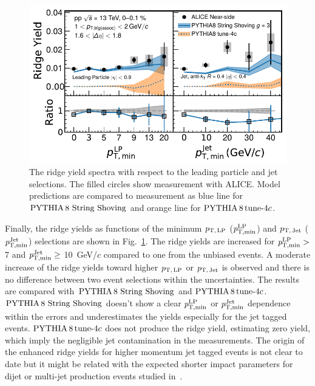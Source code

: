 \begin{figure}[h!]
	\centering
	\includegraphics[width=0.99\linewidth]{./figures/Fig6_RidgeYieldESE.pdf}
	\caption{The ridge yield spectra with respect to the leading particle and jet selections. The filled circles show measurement with ALICE. Model predictions are compared to measurement as blue line for $\mathrm{PYTHIA}\,8~\mathrm{String}~\mathrm{Shoving}$ and orange line for $\mathrm{PYTHIA}\,8\,\mathrm{tune}{\text -}4c$.}
	\label{fig:RidgeYield_ESE}
\end{figure}

Finally, the ridge yields as functions of the minimum $p_\mathrm{T,\,LP}$ ($\it{p}^{\rm{LP}}_{\rm{T,min}}$) and $p_\mathrm{T,\,Jet}$ ($\it{p}^{\rm{Jet}}_{\rm{T,min}}$) selections are shown in Fig.~\ref{fig:RidgeYield_ESE}. The ridge yields are increased for $\it{p}^{\rm{LP}}_{\rm{T,min}} >$ 7 and $\it{p}^{\rm{Jet}}_{\rm{T,min}} \ge$ 10~GeV/$c$ compared to one from the unbiased events. A moderate increase of the ridge yields toward higher $p_\mathrm{T,\,LP}$ or $p_\mathrm{T,\,Jet}$ is observed and there is no difference between two event selections within the uncertainties.
The results are compared with $\mathrm{PYTHIA}\,8~\mathrm{String}~\mathrm{Shoving}$ and $\mathrm{PYTHIA}\,8\,\mathrm{tune}{\text -}4c$. $\mathrm{PYTHIA}\,8~\mathrm{String}~\mathrm{Shoving}$ doesn't show a clear $\it{p}^{\rm{LP}}_{\rm{T,min}}$ or $\it{p}^{\rm{Jet}}_{\rm{T,min}}$ dependence within the errors and underestimates the yields especially for the jet tagged events. $\mathrm{PYTHIA}\,8\,\mathrm{tune}{\text -}4c$ does not produce the ridge yield, estimating zero yield, which imply the negligible jet contamination in the measurements.
The origin of the enhanced ridge yields for higher momentum jet tagged events is not clear to date but it might be related with the expected shorter impact parameters for dijet or multi-jet production events studied in~\cite{Frankfurt:2010ea}.
